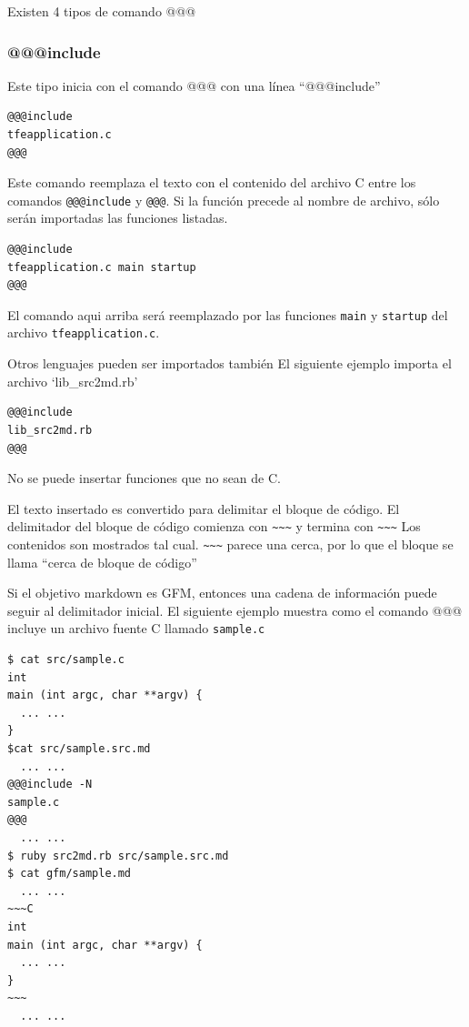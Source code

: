Existen 4 tipos de comando @@@

\hypertarget{include}{%
\subsubsection{@@@include}\label{include}}

Este tipo inicia con el comando @@@ con una línea ``@@@include''

\begin{verbatim}
@@@include
tfeapplication.c
@@@
\end{verbatim}

Este comando reemplaza el texto con el contenido del archivo C entre los
comandos \texttt{@@@include} y \texttt{@@@}. Si la función precede al
nombre de archivo, sólo serán importadas las funciones listadas.

\begin{verbatim}
@@@include
tfeapplication.c main startup
@@@
\end{verbatim}

El comando aqui arriba será reemplazado por las funciones \texttt{main}
y \texttt{startup} del archivo \texttt{tfeapplication.c}.

Otros lenguajes pueden ser importados también El siguiente ejemplo
importa el archivo `lib\_src2md.rb'

\begin{verbatim}
@@@include
lib_src2md.rb
@@@
\end{verbatim}

No se puede insertar funciones que no sean de C.

El texto insertado es convertido para delimitar el bloque de código. El
delimitador del bloque de código comienza con
\texttt{\textasciitilde{}\textasciitilde{}\textasciitilde{}} y termina
con \texttt{\textasciitilde{}\textasciitilde{}\textasciitilde{}} Los
contenidos son mostrados tal cual.
\texttt{\textasciitilde{}\textasciitilde{}\textasciitilde{}} parece una
cerca, por lo que el bloque se llama ``cerca de bloque de código''

Si el objetivo markdown es GFM, entonces una cadena de información puede
seguir al delimitador inicial. El siguiente ejemplo muestra como el
comando @@@ incluye un archivo fuente C llamado \texttt{sample.c}

\begin{verbatim}
$ cat src/sample.c
int
main (int argc, char **argv) {
  ... ...
}
$cat src/sample.src.md
  ... ...
@@@include -N
sample.c
@@@
  ... ...
$ ruby src2md.rb src/sample.src.md
$ cat gfm/sample.md
  ... ...
~~~C
int
main (int argc, char **argv) {
  ... ...
}
~~~
  ... ...
\end{verbatim}

